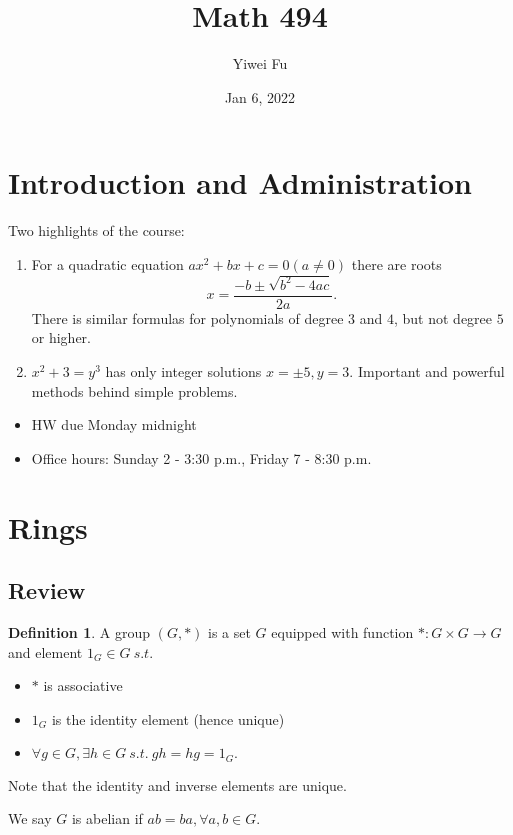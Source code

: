 \documentclass{article}
\newcommand{\st}{\ s.t.\ }
\theoremstyle{definition}
\newtheorem*{definition}{Definition}
\theoremstyle{remark}
\begin{document}
\renewcommand{\ref}[1]{\autoref{#1}}
\title{Math 494}
\author{Yiwei Fu}
\date{Jan 6, 2022}
\maketitle

\section*{Introduction and Administration}
Two highlights of the course:
\begin{enumerate}
  \item
  For a quadratic equation $ax^2 + bx + c = 0 (a \neq 0)$ there are roots
  \[
  x = \frac{-b \pm \sqrt{b^2 - 4ac}}{2a}.
  \]
  There is similar formulas for polynomials of degree $3$ and $4$, but not degree $5$ or higher.

  \item
  $x^2 + 3 = y^3$ has only integer solutions $x = \pm 5, y = 3$. 
  Important and powerful methods behind simple problems.
\end{enumerate}

\begin{itemize}
  \item HW due Monday midnight
  \item Office hours: Sunday 2 - 3:30 p.m., Friday 7 - 8:30 p.m.
\end{itemize}

\section*{Rings}
\subsection*{Review}
\begin{definition}
  A group $(G, *)$ is a set $G$ equipped with function $*:G \times G \to G$ and element $1_G \in G \st$
  \begin{itemize}
    \item $*$ is associative
    \item $1_G$ is the identity element (hence unique)
    \item $\forall g \in G, \exists h \in G \st gh = hg = 1_G.$
  \end{itemize}
\end{definition}
Note that the identity and inverse elements are unique.

We say $G$ is abelian if $ab = ba, \forall a, b \in G$.
\end{document}

